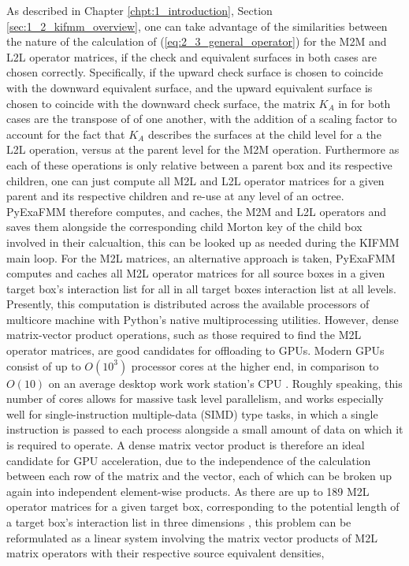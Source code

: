 As described in Chapter \ref{chpt:1_introduction}, Section \ref{sec:1_2_kifmm_overview}, one
can take advantage of the similarities between the nature of the calculation of
(\ref{eq:2_3_general_operator}) for the \gls{M2M} and \gls{L2L} operator matrices, if
the check and equivalent surfaces in both cases are chosen correctly. Specifically,
if the upward check surface is chosen to coincide with the downward equivalent
surface, and the upward equivalent surface is chosen to coincide with the
downward check surface, the matrix $K_A$ in for both cases are the transpose of
of one another, with the addition of a scaling factor to account for the fact
that $K_A$ describes the surfaces at the child level for a the \gls{L2L} operation,
versus at the parent level for the \gls{M2M} operation. Furthermore as each of these
operations is only relative between a parent box and its respective children, one
can just compute all M2L and L2L operator matrices for a given parent and its
respective children and re-use at any level of an octree. \gls{PyExaFMM} therefore
computes, and caches, the M2M and L2L operators and saves them alongside the
corresponding child Morton \gls{key} of the child box involved in their calcualtion,
 this can be looked up as needed during the \gls{KIFMM} main loop. For the M2L
 matrices, an alternative approach is taken, \gls{PyExaFMM} computes
and caches all M2L operator matrices for all source boxes in a given target box's
interaction list for all in all target boxes
interaction list at all levels. Presently, this computation is distributed across
the available processors of multicore machine
with Python's native multiprocessing utilities. However, dense matrix-vector
product operations, such as those required to find the \gls{M2L} operator
matrices, are good candidates for offloading to \gls{GPU}s. Modern \gls{GPU}s
consist of up to $O(10^3)$ processor cores at the higher end,
in comparison to $O(10)$ on an average desktop work work station's CPU
\cite{Hwu:2011:MKP}. Roughly speaking, this number of cores allows for massive task level parallelism,
and works especially well for single-instruction multiple-data (\gls{SIMD}) type tasks, in which
a single instruction is passed to each process alongside a small amount of data on which it
is required to operate. A dense matrix vector product is therefore an ideal
candidate for GPU acceleration, due to the independence of the calculation between each row
of the matrix and the vector, each of which can be broken up again into independent element-wise
products. As there are up to 189 M2L operator matrices for a given
target box, corresponding to the potential length of a target box's interaction
list in three dimensions \cite{Ying:2004:JCP}, this problem can be reformulated
as a linear system involving the matrix vector products of M2L matrix operators
with their respective source equivalent densities,

